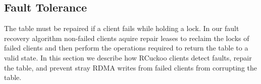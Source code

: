 



\subsection{Fault Tolerance}
\label{sec:fault-tolerance}


The table must be repaired if a client fails while holding a
lock. In our fault recovery algorithm non-failed clients
aquire repair leases to reclaim the locks of failed clients
and then perform the operations required to return the table
to a valid state. In this section we describe how RCuckoo
clients detect faults, repair the table, and prevent stray
RDMA writes from failed clients from corrupting the table.

